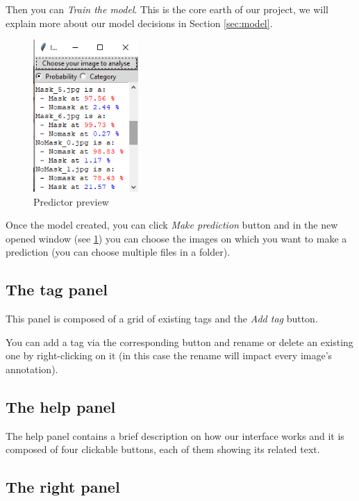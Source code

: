 \documentclass[a4paper,12pt]{article}
\begin{document}
Then you can \textit{Train the model}. This is the core earth of our project, we will explain more about our model decisions in Section \ref{sec:model}.

\begin{figure}
    \centering
    \includegraphics[width=4cm]{images_latex/Prediction.png}
    \caption{Predictor preview}
    \label{fig:pred}
\end{figure}

Once the model created, you can click \textit{Make prediction} button and in the new opened window (see \ref{fig:pred}) you can choose the images on which you want to make a prediction (you can choose multiple files in a folder).

\subsection{The tag panel}

This panel is composed of a grid of existing tags and the \textit{Add tag} button.

You can add a tag via the corresponding button and rename or delete an existing one by right-clicking on it (in this case the rename will impact every image's annotation).

\subsection{The help panel}

The help panel contains a brief description on how our interface works and it is composed of four clickable buttons, each of them showing its related text. 

\subsection{The right panel}
\end{document}
